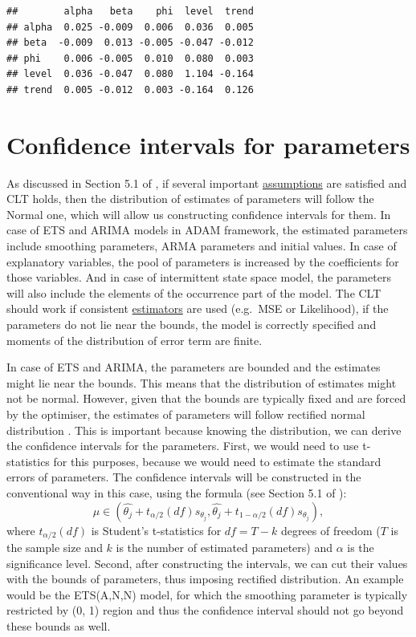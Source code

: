\documentclass[
]{book}
\theoremstyle{definition}
\theoremstyle{definition}
\theoremstyle{definition}
\theoremstyle{definition}
\theoremstyle{remark}
\begin{document}
\begin{verbatim}
##        alpha   beta    phi  level  trend
## alpha  0.025 -0.009  0.006  0.036  0.005
## beta  -0.009  0.013 -0.005 -0.047 -0.012
## phi    0.006 -0.005  0.010  0.080  0.003
## level  0.036 -0.047  0.080  1.104 -0.164
## trend  0.005 -0.012  0.003 -0.164  0.126
\end{verbatim}

\hypertarget{confidence-intervals-for-parameters}{%
\section{Confidence intervals for parameters}\label{confidence-intervals-for-parameters}}

As discussed in Section 5.1 of \citet{SvetunkovSBA}, if several important \protect\hyperlink{diagnostics}{assumptions} are satisfied and CLT holds, then the distribution of estimates of parameters will follow the Normal one, which will allow us constructing confidence intervals for them. In case of ETS and ARIMA models in ADAM framework, the estimated parameters include smoothing parameters, ARMA parameters and initial values. In case of explanatory variables, the pool of parameters is increased by the coefficients for those variables. And in case of intermittent state space model, the parameters will also include the elements of the occurrence part of the model. The CLT should work if consistent \protect\hyperlink{ADAMETSEstimation}{estimators} are used (e.g.~MSE or Likelihood), if the parameters do not lie near the bounds, the model is correctly specified and moments of the distribution of error term are finite.

In case of ETS and ARIMA, the parameters are bounded and the estimates might lie near the bounds. This means that the distribution of estimates might not be normal. However, given that the bounds are typically fixed and are forced by the optimiser, the estimates of parameters will follow rectified normal distribution \citep{WikipediaRectifiedNormal}. This is important because knowing the distribution, we can derive the confidence intervals for the parameters. First, we would need to use t-statistics for this purposes, because we would need to estimate the standard errors of parameters. The confidence intervals will be constructed in the conventional way in this case, using the formula (see Section 5.1 of \citet{SvetunkovSBA}):
\begin{equation}
    \mu \in (\hat{\theta_j} + t_{\alpha/2}(df) s_{\theta_j}, \hat{\theta_j} + t_{1-\alpha/2}(df) s_{\theta_j}), 
    \label{eq:confidenceInterval}
\end{equation}
where \(t_{\alpha/2}(df)\) is Student's t-statistics for \(df=T-k\) degrees of freedom (\(T\) is the sample size and \(k\) is the number of estimated parameters) and \(\alpha\) is the significance level. Second, after constructing the intervals, we can cut their values with the bounds of parameters, thus imposing rectified distribution. An example would be the ETS(A,N,N) model, for which the smoothing parameter is typically restricted by (0, 1) region and thus the confidence interval should not go beyond these bounds as well.
\end{document}
